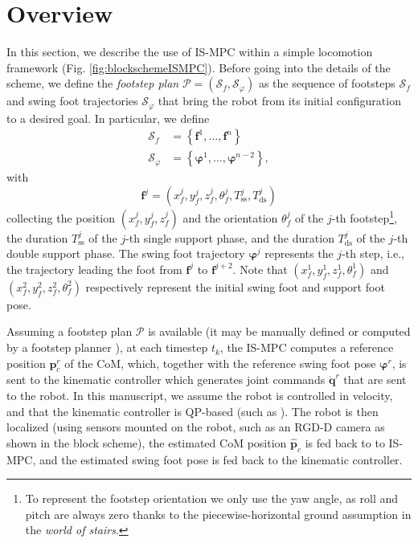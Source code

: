 \section{Overview}
In this section, we describe the use of IS-MPC within a simple locomotion
framework (Fig. \ref{fig:blockschemeISMPC}). Before going into the details of the
scheme, we define the \textit{footstep plan}
$\mathcal{P} = (\mathcal{S}_f, \mathcal{S}_{\varphi})$ as the sequence of footsteps
$\mathcal{S}_f$ and swing foot trajectories $\mathcal{S}_{\varphi}$ that bring the
robot from its initial configuration to a desired goal. In particular, we define
\begin{align*}
    \mathcal{S}_f &= \left\{ \bm{f}^1, \dots, \bm{f}^n \right\} \\
    \mathcal{S}_{\varphi} &= \left\{ \bm{\varphi}^1, \dots, \bm{\varphi}^{n-2} \right\},
\end{align*}
with
\begin{equation*}
    \bm{f}^j = \left( x_f^j, y_f^j, z_f^j, \theta_f^j, T_{\mathrm{ss}}^j, T_{\mathrm{ds}}^j \right)
\end{equation*}
collecting the position $(x_f^j, y_f^j, z_f^j)$ and the orientation $\theta_f^j$
of the $j$-th footstep\footnote{To represent the footstep orientation we only
use the yaw angle, as roll and pitch are always zero thanks to the
piecewise-horizontal ground assumption in the \textit{world of stairs}.},
the duration $T_{\mathrm{ss}}^j$ of
the $j$-th single support phase, and the duration $T_{\mathrm{ds}}^j$ of the
$j$-th double support phase. The swing foot trajectory $\bm{\varphi}^j$ represents the 
$j$-th step, i.e., the trajectory leading the foot from $\bm{f}^j$ to $\bm{f}^{j+2}$.
Note that $(x_f^1, y_f^1, z_f^1, \theta_f^1)$
and $(x_f^2, y_f^2, z_f^2, \theta_f^2)$
respectively represent the initial swing foot and support foot pose.

Assuming a footstep plan $\mathcal{P}$ is available (it may be manually defined
or computed by a footstep planner \cite{Cipriano2023RAS}), at each timestep $t_k$,
the IS-MPC computes a reference position $\bm{p}_c^r$ of the CoM, which, together
with the reference swing foot pose $\bm{\varphi}^r$, is sent to the kinematic
controller which generates joint commands $\dot{\bm{q}}^r$ that are sent to the robot.
In this manuscript, we assume the robot is controlled in velocity, and that the
kinematic controller is QP-based (such as \cite{Escande2014IJRR}).
The robot is then localized (using sensors mounted on the robot, such as an
RGD-D camera as shown in the block scheme), the estimated CoM position
$\hat{\bm{p}}_c$ is fed back to to IS-MPC, and the estimated swing foot
pose is fed back to the kinematic controller.

